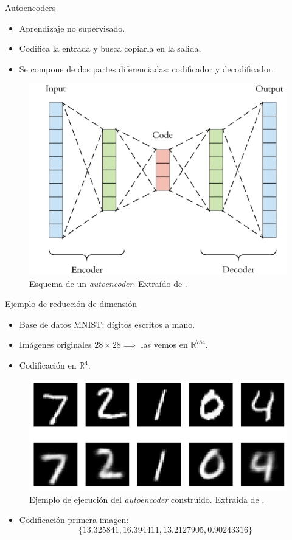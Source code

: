 \documentclass[spanish]{beamer}
\begin{document}
\begin{frame}{Autoencoders}
\begin{itemize}
\item Aprendizaje no supervisado.
\item Codifica la entrada y busca copiarla en la salida.
\item Se compone de dos partes diferenciadas: codificador y decodificador.
\end{itemize}
\vspace{1em}

\begin{figure}[h]
  \centering
  \includegraphics[width=.5\textwidth]{img/autoencoder}
  \caption{Esquema de un \textit{autoencoder}. Extraído de \parencite{arden_autoencoder_2017}.}
  \label{fig:autoencoder}
\end{figure}
\end{frame}

\begin{frame}{Ejemplo de reducción de dimensión}
  \begin{itemize}
    \item Base de datos MNIST: dígitos escritos a mano.
    \item Imágenes originales $28\times28 \implies$ las vemos en $\mathbb{R}^{784}$.
    \item Codificación en $\mathbb{R}^4$.
  \end{itemize}
\vspace{1em}
\begin{figure}[h]
  \centering
  \includegraphics[width=.55\textwidth]{img/autoencoder_ex1}
  \caption{Ejemplo de ejecución del \textit{autoencoder} construido. Extraída de \parencite{arden_autoencoder_2017}.}
  \label{fig:autoencoder_ex1}
\end{figure}
\vspace{-1em}
\begin{itemize}
\item Codificación primera imagen: $$\{13.325841, 16.394411, 13.2127905, 0.90243316\}$$
\end{itemize}

\end{frame}
\end{document}
